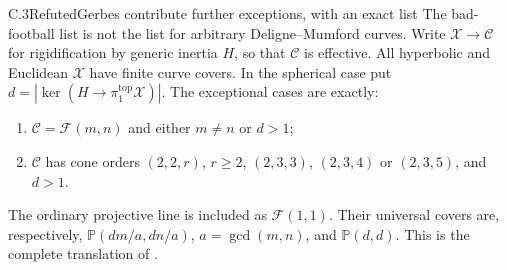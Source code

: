 \begin{statement}{C.3}{Refuted}{Gerbes contribute further exceptions, with an exact list}
The bad-football list is not the list for arbitrary
Deligne--Mumford curves. Write $\mathcal X\to\mathcal C$ for
rigidification by generic inertia $H$, so that $\mathcal C$ is
effective. All hyperbolic and Euclidean $\mathcal X$ have finite
curve covers. In the spherical case put
$d=|\ker(H\to\pi_1^{\mathrm{top}}\mathcal X)|$.
The exceptional cases are exactly:
\begin{enumerate}
\item $\mathcal C=\mathcal F(m,n)$ and either $m\ne n$ or $d>1$;
\item $\mathcal C$ has cone orders $(2,2,r)$, $r\geq2$,
      $(2,3,3)$, $(2,3,4)$ or $(2,3,5)$, and $d>1$.
\end{enumerate}
The ordinary projective line is included as $\mathcal F(1,1)$.
Their universal covers are, respectively,
$\mathbb P(dm/a,dn/a)$, $a=\gcd(m,n)$, and $\mathbb P(d,d)$.
This is the complete translation of
\citet[Propositions 7.4--7.6 and Corollary 7.7]{BehrendNoohi2006}.
\end{statement}
